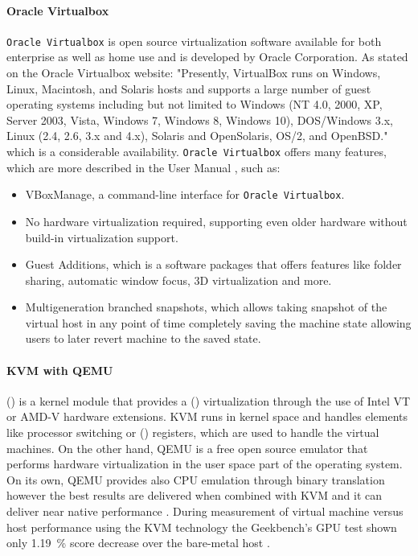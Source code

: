 \paragraph{Oracle Virtualbox}
\texttt{Oracle Virtualbox} is open source virtualization software available for both enterprise as well as home use and is developed by Oracle Corporation. As stated on the Oracle Virtualbox website: "Presently, VirtualBox runs on Windows, Linux, Macintosh, and Solaris hosts and supports a large number of guest operating systems including but not limited to Windows (NT 4.0, 2000, XP, Server 2003, Vista, Windows 7, Windows 8, Windows 10), DOS/Windows 3.x, Linux (2.4, 2.6, 3.x and 4.x), Solaris and OpenSolaris, OS/2, and OpenBSD." \cite{oraclehome} which is a considerable availability. \texttt{Oracle Virtualbox} offers many features, which are more described in the User Manual \cite{oracledatasheet}, such as:
\begin{itemize}
	\item VBoxManage, a command-line interface for \texttt{Oracle Virtualbox}.
	\item No hardware virtualization required, supporting even older hardware without build-in virtualization support. 
	\item Guest Additions, which is a software packages that offers features like folder sharing, automatic window focus, 3D virtualization and more.
	\item Multigeneration branched snapshots, which allows taking snapshot of the virtual host in any point of time completely saving the machine state allowing users to later revert machine to the saved state.
\end{itemize}
\paragraph{KVM with QEMU}
 () is a kernel module that provides a  () virtualization through the use of Intel VT or AMD-V hardware extensions. KVM runs in kernel space and handles elements like processor switching or  () registers, which are used to handle the virtual machines. On the other hand, QEMU is a free open source emulator that performs hardware virtualization in the user space part of the operating system. On its own, QEMU provides also CPU emulation through binary translation however the best results are delivered when combined with KVM and it can deliver near native performance \cite{kvmspeed}. During measurement of virtual machine versus host performance using the KVM technology the Geekbench’s GPU test shown only \SI{1.19}{\percent} score decrease over the bare-metal host \cite{kvmbenchmark}.


